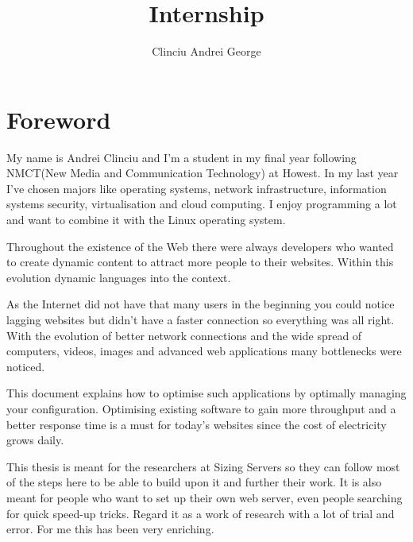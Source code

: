 

\author{Clinciu Andrei George}
\title{Internship}



%
\pagestyle{empty}%
\thispagestyle{empty}



\clearpage{}
\section*{Foreword}
My name is Andrei Clinciu and I'm a student in my final year following NMCT(New Media and Communication Technology) at Howest.
In my last year I've chosen majors like operating systems, network infrastructure, information systems security, virtualisation and cloud computing.
I enjoy programming a lot and want to combine it with the Linux operating system.

Throughout the existence of the Web there were always developers who wanted to create dynamic content to attract more people to their websites.
Within this evolution dynamic languages into the context. 

As the Internet did not have that many users in the beginning you could notice lagging websites but didn't have a faster connection so everything was all right.
With the evolution of better network connections and the wide spread of computers, videos, images and advanced web applications many bottlenecks were noticed.

This document explains how to optimise such applications by optimally managing your configuration.
Optimising existing software to gain more throughput and a better response time is a must for today's websites since the cost of electricity grows daily.

This thesis is meant for the researchers at Sizing Servers so they can follow most of the steps here to be able to build upon it and further their work.
It is also meant for people who want to set up their own web server, even people searching for quick speed-up tricks.
Regard it as a work of research with a lot of trial and error. For me this has been very enriching. 

